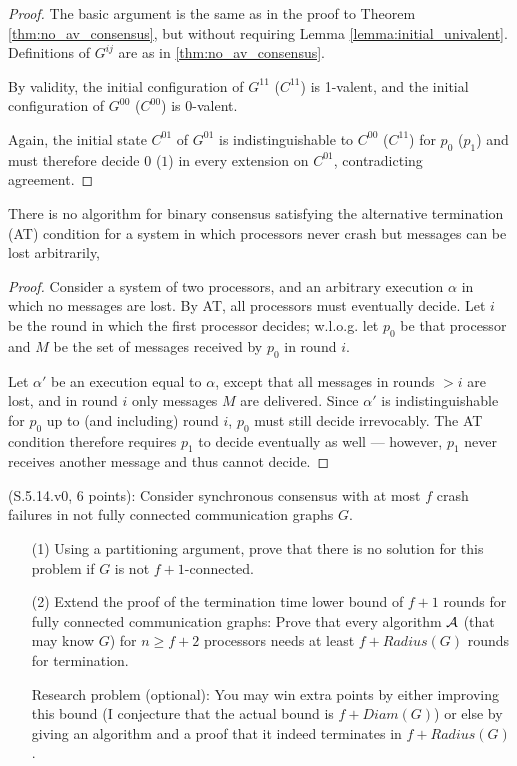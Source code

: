 \begin{proof}
The basic argument is the same as in the proof to Theorem \ref{thm:no_av_consensus},
but without requiring Lemma \ref{lemma:initial_univalent}. Definitions of
$G^{ij}$ are as in \ref{thm:no_av_consensus}.

By validity, the initial configuration of
$G^{11}$ ($C^{11}$) is 1-valent, and the initial configuration
of $G^{00}$ ($C^{00}$) is 0-valent.

Again, the initial state $C^{01}$ of $G^{01}$ is indistinguishable to $C^{00}$
($C^{11}$) for $p_0$ ($p_1$) and must therefore decide $0$ ($1$) in every extension
on $C^{01}$, contradicting agreement.
\end{proof}

\begin{theorem}
There is no algorithm for binary consensus satisfying the alternative termination (AT)
condition for a system in which processors never crash but messages can be
lost arbitrarily,
\end{theorem}

\begin{proof}
Consider a system of two processors, and an arbitrary execution $\alpha$ in which
no messages are lost. By AT, all processors must eventually decide. Let $i$
be the round in which the first processor decides; w.l.o.g. let
$p_0$ be that processor and $M$ be the set of messages received by $p_0$ in
round $i$.

Let $\alpha'$ be an execution equal to $\alpha$, except that all messages
in rounds $> i$ are lost, and in round $i$ only messages $M$ are delivered.
Since $\alpha'$ is indistinguishable for $p_0$ up to (and including) round $i$,
$p_0$ must still decide irrevocably. The AT condition therefore requires $p_1$ to
decide eventually as well --- however, $p_1$ never receives another message
and thus cannot decide.
\end{proof}


\begin{Exc}{(S.5.14.v0, 6 points):}
Consider synchronous consensus with at most $f$ crash failures in not
fully connected communication graphs $G$.
\begin{enumerate}
\item[(1)] Using a partitioning argument, prove that there is no solution for this problem if $G$
is not $f+1$-connected.
\item[(2)] Extend the proof of the termination time lower bound of $f+1$ rounds
for fully connected communication graphs: Prove that every algorithm ${\cal A}$
(that may know $G$) for $n\geq f+2$ processors needs at least $f+Radius(G)$ rounds
for termination.

Research problem (optional): You may win extra points by either improving this
bound (I conjecture that the actual bound is $f+Diam(G)$) or else
by giving an algorithm and a proof that it indeed terminates in
$f+Radius(G)$.
\end{enumerate}
\end{Exc}

